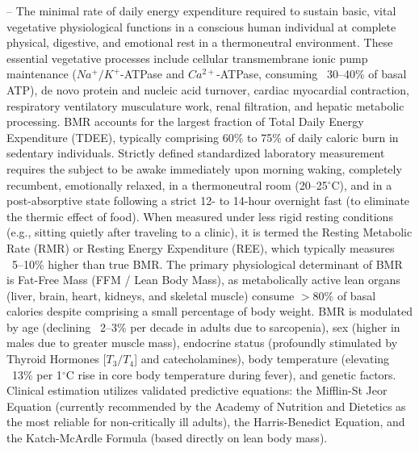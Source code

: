 -- The minimal rate of daily energy expenditure required to sustain basic, vital vegetative physiological functions in a conscious human individual at complete physical, digestive, and emotional rest in a thermoneutral environment. These essential vegetative processes include cellular transmembrane ionic pump maintenance ($Na^+/K^+$-ATPase and $Ca^{2+}$-ATPase, consuming ~30--40\% of basal ATP), de novo protein and nucleic acid turnover, cardiac myocardial contraction, respiratory ventilatory musculature work, renal filtration, and hepatic metabolic processing. BMR accounts for the largest fraction of Total Daily Energy Expenditure (TDEE), typically comprising 60\% to 75\% of daily caloric burn in sedentary individuals. Strictly defined standardized laboratory measurement requires the subject to be awake immediately upon morning waking, completely recumbent, emotionally relaxed, in a thermoneutral room (20--25$^\circ$C), and in a post-absorptive state following a strict 12- to 14-hour overnight fast (to eliminate the thermic effect of food). When measured under less rigid resting conditions (e.g., sitting quietly after traveling to a clinic), it is termed the Resting Metabolic Rate (RMR) or Resting Energy Expenditure (REE), which typically measures ~5--10\% higher than true BMR. The primary physiological determinant of BMR is Fat-Free Mass (FFM / Lean Body Mass), as metabolically active lean organs (liver, brain, heart, kidneys, and skeletal muscle) consume $>80\%$ of basal calories despite comprising a small percentage of body weight. BMR is modulated by age (declining ~2--3\% per decade in adults due to sarcopenia), sex (higher in males due to greater muscle mass), endocrine status (profoundly stimulated by Thyroid Hormones [$T_3/T_4$] and catecholamines), body temperature (elevating ~13\% per 1$^\circ$C rise in core body temperature during fever), and genetic factors. Clinical estimation utilizes validated predictive equations: the Mifflin-St Jeor Equation (currently recommended by the Academy of Nutrition and Dietetics as the most reliable for non-critically ill adults), the Harris-Benedict Equation, and the Katch-McArdle Formula (based directly on lean body mass).

